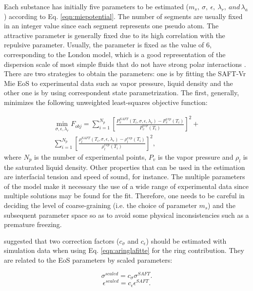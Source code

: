 	Each substance has initially five parameters to be estimated ($m_s,\ \sigma,\ \epsilon,\ \lambda_{r},\ and \, \lambda_{a}$) according to Eq. \eqref{eqn:miepotential}. The number of segments are usually fixed in an integer value since each segment represents one pseudo atom. The attractive parameter is generally  fixed due to its  high correlation with the repulsive parameter. Usually, the parameter is fixed as the value of 6, corresponding to the London model, which is a good representation of the dispersion scale of most simple fluids that do not have strong polar interactions \cite{ramrattan2015,herdes2015}. There are two strategies to obtain the parameters: one is by fitting the SAFT-Vr Mie EoS to experimental data such as vapor pressure, liquid density and the other one is by using correspondent state parametrization. The first, generally, minimizes the following unweighted least-squares objective function:
	
	\begin{equation}
	\begin{aligned}
	\min\limits_{\sigma,\epsilon,\lambda_{r}} F_{obj}= \sum_{i=1}^{N_{p}} \left[\frac{P_{v}^{SAFT}(T_{i},\sigma,\epsilon,\lambda_{r})-P_{v}^{exp}(T_{i})}{P_{v}^{exp}(T_{i})} \right]^2 +\\
	\sum_{i=1}^{N_{p}} \left[\frac{\rho_{l}^{SAFT}(T_{i},\sigma,\epsilon,\lambda_{r})-\rho_{l}^{exp}(T_{i})}{\rho_{l}^{exp}(T_{i})} \right]^2 ,
	\end{aligned}
	\label{eqn:fobj}
	\end{equation}
	where $N_{p}$ is the number of experimental points, $P_{v}$ is the vapor pressure and $\rho_{l}$ is the saturated liquid density. Other properties that can be used in the estimation are interfacial tension and speed of sound, for instance. The multiple parameters of the model make it necessary the use of a wide range of experimental data since multiple solutions may be found for the fit. Therefore, one needs to be careful in deciding the level of coarse-graining (i.e. the choice of parameter $m_{s}$) and the subsequent parameter space so as to avoid some physical inconsistencies such as a premature freezing.
	
	 suggested that two correction factors ($c_{\sigma}$ and $c_{\epsilon}$) should be estimated with simulation data when using Eq. \eqref{eqn:aringlafitte} for the ring contribution. They are related to the EoS parameters by scaled parameters:
	
	\begin{equation}
	\sigma^{scaled} = c_{\sigma}\sigma^{SAFT}.
	\label{eqn:csigma}
	\end{equation}
	\begin{equation}
	\epsilon^{scaled} = c_{\epsilon}\epsilon^{SAFT}.
	\label{eqn:ceps}
	\end{equation}
	
